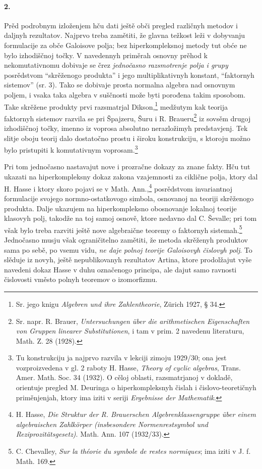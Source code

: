\documentclass[11pt]{article}
\newcommand{\foreign}[1]{#1}
\begin{document}
\paragraph{2.}
Prěd podrobnym izloženjem hču dati ještě obči pregled različnyh metodov i daljnyh rezultatov. Najprvo treba zamětiti, že glavna težkost leži v dobyvanju formulacije za obče Galoisove polja; bez hiperkompleksnoj metody tut obće ne bylo izhodiščnoj točky. V navedennyh priměrah osnovny prěhod k nekomutativnomu dobivaje se črez \emph{jednočasno razsmotrenje polja i grupy} posrědstvom ``skrěženogo produkta'' i jego multiplikativnyh konstant, ``faktornyh sistemov'' (sr. 3). Tako se dobivaje prosta normalna algebra nad osnovnym poljem, i vsaka taka algebra v suščnosti može byti porođena takim sposobom. Take skrěžene produkty prvi razsmatrjal Dikson,\footnote{Sr. jego knigu \foreign{\emph{Algebren und ihre Zahlentheorie}}, Zürich 1927, § 34.} medžutym kak teorija faktornyh sistemov razvila se pri Špajzeru, Šuru i R. Braueru\footnote{Sr. napr. R. Brauer, \foreign{\emph{Untersuchungen über die arithmetischen Eigenschaften von Gruppen linearer Substitutionen}}, i tam v prim. 2 navedenu literaturu, Math. Z. 28 (1928).} iz sovsěm drugoj izhodiščnoj točky, imenno iz voprosa absolutno nerazložimyh predstavjenj. Tek slitje oboju teorij dalo dostatočno prostu i široku konstrukciju, s ktoroju možno bylo pristupiti k komutativnym voprosam.\footnote{Tu konstrukciju ja najprvo razvila v lekciji zimoju 1929/30; ona jest vozproizvedena v gl. 2 raboty H. Hasse, \foreign{\emph{Theory of cyclic algebras}}, Trans. Amer. Math. Soc. 34 (1932). O cěloj oblasti, razsmatrjanoj v dokladě, orientuje pregled M. Deuringa o hiperkompleksnyh čislah i čislovo-teoretičnyh priměnjenjah, ktory ima iziti v seriji \foreign{\emph{Ergebnisse der Mathematik}}.}

Pri tom jednočasno nastavajut nove i prozračne dokazy za znane fakty. Hču tut ukazati na hiperkompleksny dokaz zakona vzajemnosti za ciklične polja, ktory dal H. Hasse i ktory skoro pojavi se v \foreign{Math. Ann.},\footnote{H. Hasse, \foreign{\emph{Die Struktur der R. Brauerschen Algebrenklassengruppe über einem algebraischen Zahlkörper (insbesondere Normenrestsymbol und Reziprozitätsgesetz)}}. Math. Ann. 107 (1932/33).} posrědstvom invariantnoj formulacije svojego normno-ostatkovogo simbola, osnovanoj na teoriji skrěženogo produkta. Dalje ukazujem na hiperkompleksno obosnovanje lokalnoj teorije klasovyh polj, takodže na toj samoj osnově, ktore nedavno dal C. Ševalle; pri tom však bylo treba razviti ještě nove algebraične teoremy o faktornyh sistemah.\footnote{C. Chevalley, \foreign{\emph{Sur la théorie du symbole de restes normiques}}; ima iziti v J. f. Math. 169.} Jednočasno musju však ograničitelno zamětiti, že metoda skrěženyh produktov sama po sebě, po vsemu vidu, \emph{ne daje polnoj teorije Galoisovyh čislovyh polj}. To slěduje iz novyh, ještě nepublikovanyh rezultatov Artina, ktore prodolžajut vyše navedeni dokaz Hasse v duhu označenogo principa, ale dajut samo ravnosti čislovosti vměsto polnyh teoremov o izomorfizmu.
\end{document}
